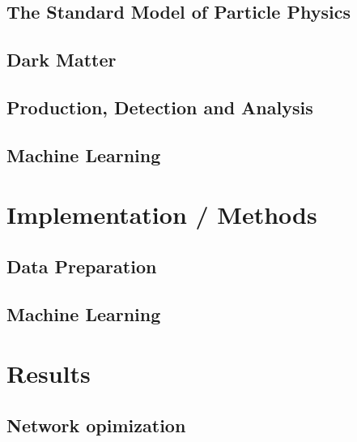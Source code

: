 \documentclass[12pt, a4paper]{book}
\begin{document}
\chapter{The Standard Model of Particle Physics}\label{chap:SM}


\chapter{Dark Matter}\label{chap:DM}


\chapter{Production, Detection and Analysis}\label{chap:CERN_method}


\chapter{Machine Learning}



\part{Implementation / Methods}


\chapter{Data Preparation}\label{chap:data_prep}


\chapter{Machine Learning}\label{chap:ML}


\part{Results}

\chapter{Network opimization}\label{chap:network_opt}



\end{document}
